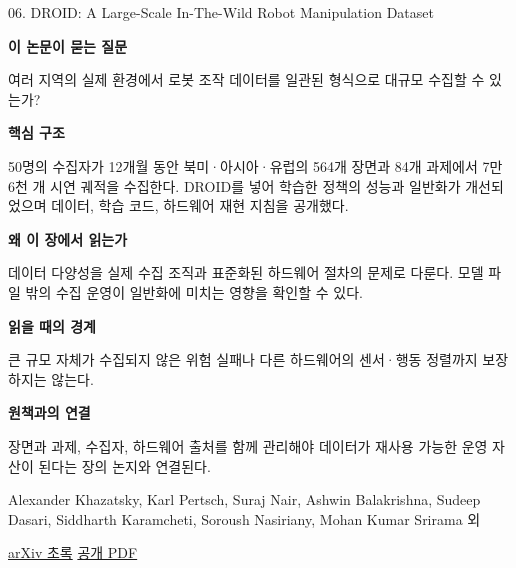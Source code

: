 \documentclass[11pt,openany]{book}
\begin{document}
\begin{termcard}{06. DROID: A Large-Scale In-The-Wild Robot Manipulation Dataset}

\par

\medskip

{\sffamily\bfseries\color{deepblue} 이 논문이 묻는 질문}\par

여러 지역의 실제 환경에서 로봇 조작 데이터를 일관된 형식으로 대규모 수집할 수 있는가?

\smallskip

{\sffamily\bfseries\color{deepblue} 핵심 구조}\par

50명의 수집자가 12개월 동안 북미·아시아·유럽의 564개 장면과 84개 과제에서 7만 6천 개 시연 궤적을 수집한다. DROID를 넣어 학습한 정책의 성능과 일반화가 개선되었으며 데이터, 학습 코드, 하드웨어 재현 지침을 공개했다.

\smallskip

{\sffamily\bfseries\color{deepblue} 왜 이 장에서 읽는가}\par

데이터 다양성을 실제 수집 조직과 표준화된 하드웨어 절차의 문제로 다룬다. 모델 파일 밖의 수집 운영이 일반화에 미치는 영향을 확인할 수 있다.

\smallskip

{\sffamily\bfseries\color{coral} 읽을 때의 경계}\par

큰 규모 자체가 수집되지 않은 위험 실패나 다른 하드웨어의 센서·행동 정렬까지 보장하지는 않는다.

\smallskip

{\sffamily\bfseries\color{teal} 원책과의 연결}\par

장면과 과제, 수집자, 하드웨어 출처를 함께 관리해야 데이터가 재사용 가능한 운영 자산이 된다는 장의 논지와 연결된다.

\medskip

{\footnotesize\color{muted} Alexander Khazatsky, Karl Pertsch, Suraj Nair, Ashwin Balakrishna, Sudeep Dasari, Siddharth Karamcheti, Soroush Nasiriany, Mohan Kumar Srirama 외\par

\href{https://arxiv.org/abs/2403.12945}{arXiv 초록} \quad \href{https://arxiv.org/pdf/2403.12945}{공개 PDF}\par}

\end{termcard}
\end{document}
